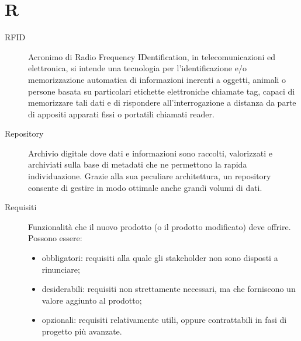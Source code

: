 \documentclass[a4paper, oneside]{article}
\begin{document}
\section{R}
\begin{description}
  \item[RFID] Acronimo di Radio Frequency IDentification, in telecomunicazioni ed elettronica, si intende una tecnologia per l'identificazione e/o memorizzazione automatica di informazioni inerenti a oggetti, animali o persone basata su particolari etichette elettroniche chiamate tag, capaci di memorizzare tali dati e di rispondere all'interrogazione a distanza da parte di appositi apparati fissi o portatili chiamati reader.
  \item[Repository] Archivio digitale dove dati e informazioni sono raccolti, valorizzati e archiviati sulla base di metadati che ne permettono la rapida individuazione. Grazie alla sua peculiare architettura, un repository consente di gestire in modo ottimale anche grandi volumi di dati.
  \item[Requisiti] Funzionalità che il nuovo prodotto (o il prodotto modificato) deve offrire. \newline Possono essere: \begin{itemize} \item obbligatori: requisiti alla quale gli stakeholder non sono disposti a rinunciare; \item desiderabili: requisiti non strettamente necessari, ma che forniscono un valore aggiunto al prodotto; \item opzionali: requisiti relativamente utili, oppure contrattabili in fasi di progetto più avanzate. \end{itemize}
\end{description}
\newpage
\end{document}
